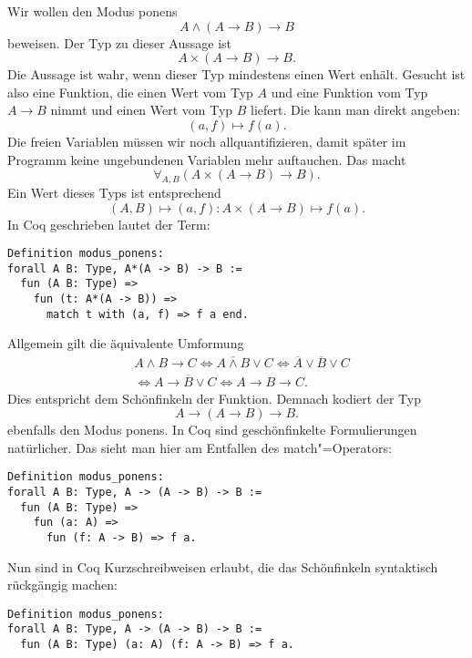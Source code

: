 \documentclass[a4paper,10pt,fleqn,twocolumn,twoside,dvipdfmx]{scrartcl}
\numberwithin{equation}{section}
\begin{document}
Wir wollen den Modus ponens%
\begin{equation}
A\land (A\rightarrow B)\rightarrow B
\end{equation}
beweisen. Der Typ zu dieser Aussage ist%
\begin{equation}
A\times (A\rightarrow B)\rightarrow B.
\end{equation}
Die Aussage ist wahr, wenn dieser Typ mindestens einen Wert enhält.
Gesucht ist also eine Funktion, die einen Wert vom Typ $A$ und
eine Funktion vom Typ $A\rightarrow B$ nimmt und einen Wert vom
Typ $B$ liefert. Die kann man direkt angeben:%
\begin{equation}
(a, f)\mapsto f(a).
\end{equation}
Die freien Variablen müssen wir noch allquantifizieren, damit später
im Programm keine ungebundenen Variablen mehr auftauchen. Das macht%
\begin{equation}
\forall_{A, B}(A\times (A\to B)\to B).
\end{equation}
Ein Wert dieses Typs ist entsprechend%
\begin{equation}
(A, B) \mapsto (a, f)\colon A\times (A\to B)\mapsto f(a).
\end{equation}
In Coq geschrieben lautet der Term:%
\begin{lstlisting}[language=Coq]
Definition modus_ponens:
forall A B: Type, A*(A -> B) -> B :=
  fun (A B: Type) =>
    fun (t: A*(A -> B)) =>
      match t with (a, f) => f a end.
\end{lstlisting}
Allgemein gilt die äquivalente Umformung%
\begin{equation}
\begin{aligned}
& A\land B\to C \iff \overline{A\land B}\lor C
\iff\overline A\lor\overline B\lor C\\
&\iff A\to \overline B\lor C
\iff A\to B\to C.
\end{aligned}
\end{equation}
Dies entspricht dem Schönfinkeln der Funktion. Demnach kodiert
der Typ%
\begin{equation}
A\to (A\to B)\to B.
\end{equation}
ebenfalls den Modus ponens. In Coq sind geschönfinkelte Formulierungen
natürlicher. Das sieht man hier am Entfallen des match"=Operators:%
\begin{lstlisting}[language=Coq]
Definition modus_ponens:
forall A B: Type, A -> (A -> B) -> B :=
  fun (A B: Type) =>
    fun (a: A) =>
      fun (f: A -> B) => f a.
\end{lstlisting}
Nun sind in Coq Kurzschreibweisen erlaubt, die das Schönfinkeln
syntaktisch rückgängig machen:%
\begin{lstlisting}[language=Coq]
Definition modus_ponens:
forall A B: Type, A -> (A -> B) -> B :=
  fun (A B: Type) (a: A) (f: A -> B) => f a.
\end{lstlisting}
\end{document}
